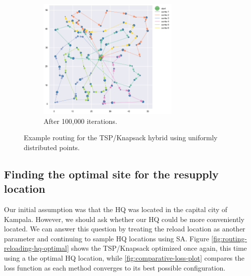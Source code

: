 \documentclass{article} %
\begin{document}
\begin{figure}[H]
\begin{subfigure}[b]{0.5\textwidth}
  \end{subfigure}
  \begin{subfigure}[b]{\textwidth}
    \centering
    \includegraphics[width=0.75\textwidth]{figures/sorties-100000}
    \caption{After 100,000 iterations.}
  \end{subfigure}
  \caption{Example routing for the TSP/Knapsack hybrid using uniformly distributed points.}
  \label{fig:sorties}
\end{figure}

\subsection{Finding the optimal site for the resupply location}

Our initial assumption was that the HQ was located in the capital city of Kampala. However, we should ask whether our HQ could be more conveniently located. We can answer this question by treating the reload location as another parameter and continuing to sample HQ locations using SA. Figure \ref{fig:routing-reloading-hq-optimal} shows the TSP/Knapsack optimized once again, this time using a the optimal HQ location, while \ref{fig:comparative-loss-plot} compares the loss function as each method converges to its best possible configuration.
\end{document}
